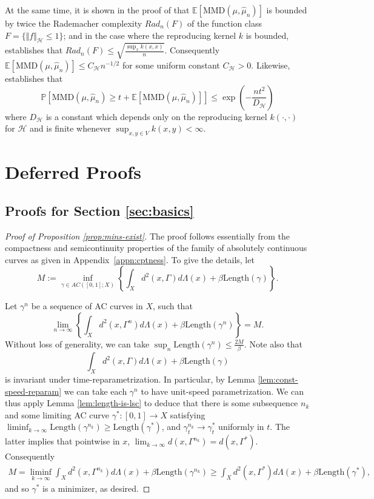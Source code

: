 \documentclass[aos, preprint]{imsart}
\theoremstyle{plain}
\theoremstyle{remark}
\begin{document}
\begin{appendix}
At the same time, it is shown in the proof of \cite[Theorem 4.10]{wainwright2019high}  that $\mathbb{E}[\text{MMD}(\mu,\hat{\mu}_{n})]$
is bounded by twice the Rademacher complexity $Rad_{n}(F)$ of the
function class $F=\{\Vert f\Vert_{\mathcal{H}}\leq1\}$; and in the
case where the reproducing kernel $k$ is bounded, \cite[Section 4.3]{bartlett2002rademacher} establishes that $Rad_{n}(F)\leq\sqrt{\frac{\sup_{x}k(x,x)}{n}}$.
Consequently $\mathbb{E}[\text{MMD}(\mu,\hat{\mu}_{n})]\leq C_{\mathcal{H}}n^{-1/2}$
for some uniform constant $C_{\mathcal{H}}>0$. Likewise, \cite[Theorem 4.10]{wainwright2019high} establishes that
\[
\mathbb{P}[\text{MMD}(\mu,\hat{\mu}_{n})\geq t+\mathbb{E}[\text{MMD}(\mu,\hat{\mu}_{n})]]\leq\exp\left(-\frac{nt^{2}}{D_{\mathcal{H}}}\right)
\]
where $D_{\mathcal{H}}$ is a constant which depends only on the reproducing
kernel $k(\cdot,\cdot)$ for $\mathcal{H}$ and is finite whenever
$\sup_{x,y\in V}k(x,y)<\infty$.
\section{Deferred Proofs}
\subsection{\texorpdfstring{Proofs for Section \ref{sec:basics}}{Proofs for Section 2}}
\label{subsec:proofs-for-basics}
\begin{proof}[Proof of Proposition \ref{prop:mins-exist}]
The proof follows essentially from the compactness and semicontinuity properties of the family of absolutely continuous curves as given in
Appendix~\ref{appn:cptness}. To give the details,  let
\[
M:=\inf_{\gamma\in AC([0,1];X)}\left\{ \int_{X}d^{2}(x,\Gamma)d\Lambda(x)+\beta\text{Length}(\gamma)\right\} .
\]

  Let $\gamma^{n}$ be a sequence of AC curves in $X$, such that
\[
\lim_{n\rightarrow\infty}\left\{ \int_{X}d^{2}(x,\Gamma^{n})d\Lambda(x)+\beta\text{Length}(\gamma^{n})\right\} =M.
\]
Without loss of generality, we can take $\sup_{n}
  \text{Length}(\gamma^{n}) \leq \frac{2M}{\beta}$. Note also
that
\[
\int_{X}d^{2}(x,\Gamma)d\Lambda(x)+\beta\text{Length}(\gamma)
\]
is invariant under time-reparametrization. In
particular, by Lemma \ref{lem:const-speed-reparam} we can
take each $\gamma^{n}$ to have unit-speed
parametrization.
  We can thus apply Lemma \ref{lem:length-is-lsc}
to deduce that there is some subsequence $n_{k}$ and some limiting AC
curve $\gamma^{*}:[0,1]\rightarrow X$ satisfying
$\liminf_{k\rightarrow\infty} \text{Length}(\gamma^{n_{k}}) \geq
\text{Length}(\gamma^{*})$, and $\gamma_{t}^{n_{k}} \rightarrow
  \gamma_{t}^{*}$ uniformly in $t$. The latter
  implies that pointwise in $x$, $\lim_{k\rightarrow\infty}
  d(x,\Gamma^{n_{k}}) = d(x,\Gamma^{*})$. Consequently
\begin{multline*}
M=\liminf_{k\rightarrow\infty}\int_{X}d^{2}(x,\Gamma^{n_{k}})d\Lambda(x)+\beta\text{Length}(\gamma^{n_{k}})\geq\int_{X}d^{2}(x,\Gamma^{*})d\Lambda(x)+\beta\text{Length}(\gamma^{*}),
\end{multline*}
and so $\gamma^{*}$ is a minimizer, as desired.
\end{proof}


\end{appendix}
\end{document}
